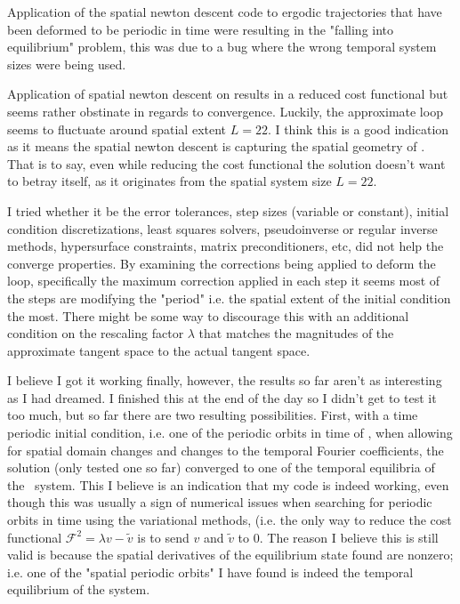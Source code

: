 Application of the spatial {newton descent} code to ergodic trajectories that have been deformed to
be periodic in time were resulting in the "falling into equilibrium" problem, this was due to a bug
where the wrong temporal system sizes were being used.

Application of spatial {newton descent} on  results in a reduced cost
functional but seems rather obstinate in regards to convergence. Luckily, the
approximate loop seems to fluctuate around spatial extent $L=22$. I think this
is a good indication as it means the spatial {newton descent} is capturing the
spatial geometry of . That is to say, even while reducing the cost
functional the solution doesn't want to betray itself, as it originates from
the spatial system size $L=22$.

I tried whether it be the error tolerances, step sizes (variable or constant), initial condition
discretizations, least squares solvers, pseudoinverse or regular inverse methods, hypersurface constraints,
matrix preconditioners, etc, did not help the converge properties.
By examining the corrections being applied to deform the loop, specifically the maximum correction applied
in each step it seems most of the steps are modifying the "period" i.e. the spatial extent of the initial
condition the most. There might be some way to discourage this with an additional condition on the
rescaling factor $\lambda$ that matches the magnitudes of the approximate tangent space to the
actual tangent space.


I believe I got it working finally, however, the results so far aren't as
interesting as I had dreamed. I finished this at the end of the day so I didn't
get to test it too much, but so far there are two resulting possibilities.
First, with a time periodic initial condition, i.e. one of the periodic orbits
in time of \KS, when allowing for spatial domain changes and changes to the
temporal Fourier coefficients, the solution (only tested one so far) converged
to one of the temporal equilibria of the \KS\ system. This I believe is an
indication that my code is indeed working, even though this was usually a sign
of numerical issues when searching for periodic orbits in time using the
variational methods, (i.e. the only way to reduce the cost functional
$\mathcal{F}^2 = \lambda v - \tilde{v}$ is to send $v$ and $\tilde{v}$ to $0$.
The reason I believe this is still valid is because the spatial derivatives of
the equilibrium state found are nonzero; i.e. one of the "spatial periodic
orbits" I have found is indeed the temporal equilibrium of the system.


